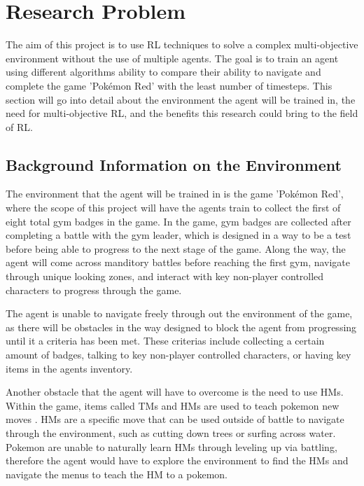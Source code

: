 \section{Research Problem}

The aim of this project is to use RL techniques to solve a complex multi-objective environment without the use of multiple agents. The goal is to train an agent using different algorithms ability to compare their ability to navigate and complete the game 'Pokémon Red' with the least number of timesteps. This section will go into detail about the environment the agent will be trained in, the need for multi-objective RL, and the benefits this research could bring to the field of RL.

\subsection{Background Information on the Environment}

The environment that the agent will be trained in is the game 'Pokémon Red', where the scope of this project will have the agents train to collect the first of eight total gym badges in the game. In the game, gym badges are collected after completing a battle with the gym leader, which is designed in a way to be a test before being able to progress to the next stage of the game. Along the way, the agent will come across manditory battles before reaching the first gym, navigate through unique looking zones, and interact with key non-player controlled characters to progress through the game. 

The agent is unable to navigate freely through out the environment of the game, as there will be obstacles in the way designed to block the agent from progressing until it a criteria has been met. These criterias include collecting a certain amount of badges, talking to key non-player controlled characters, or having key items in the agents inventory.  

Another obstacle that the agent will have to overcome is the need to use HMs. Within the game, items called TMs and HMs are used to teach pokemon new moves \cite{SerebiiTeam2016}. HMs are a specific move that can be used outside of battle to navigate through the environment, such as cutting down trees or surfing across water. Pokemon are unable to naturally learn HMs through leveling up via battling, therefore the agent would have to explore the environment to find the HMs and navigate the menus to teach the HM to a pokemon.

